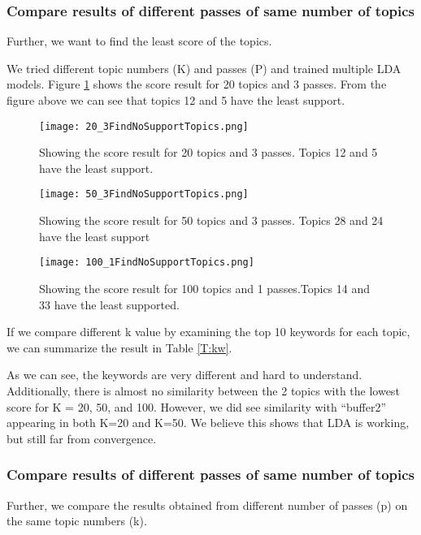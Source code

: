 \subsubsection{Compare results of different passes of same number of topics}
Further, we want to find the least score of the topics.

We tried different topic numbers (K) and passes (P) and trained multiple LDA models.
Figure \ref{fig:20_3} shows the score result for 20 topics and 3 passes. From the figure above we can see that topics 12 and 5 have the least support.


\begin{figure}
	\center
	\texttt{[image: 20\_3FindNoSupportTopics.png]}
	\caption{Showing the score result for 20 topics and 3 passes. Topics 12 and 5 have the least support.}
	\label{fig:20_3}
\end{figure}

\begin{figure}
	\center
	\texttt{[image: 50\_3FindNoSupportTopics.png]}
	\caption{Showing the score result for 50 topics and 3 passes. Topics 28 and 24 have the least support}
	\label{fig:50_3}
\end{figure}
\begin{figure}
	\center
	\texttt{[image: 100\_1FindNoSupportTopics.png]}
	\caption{Showing the score result for 100 topics and 1 passes.Topics 14 and 33 have the least supported.}
	\label{fig:100_1}
\end{figure}

If we compare different k value by examining the top 10 keywords for each topic, we can summarize the result in Table \ref{T:kw}.





As we can see, the keywords are very different and hard to understand. Additionally, there is almost no similarity between the 2 topics with the lowest score for K = 20, 50, and 100. However, we did see similarity with “buffer2” appearing in both K=20 and K=50. We believe this shows that LDA is working, but still far from convergence. 


\subsubsection{Compare results of different passes of same number of topics}
Further, we compare the results obtained from different number of passes (p) on the same topic numbers (k).

